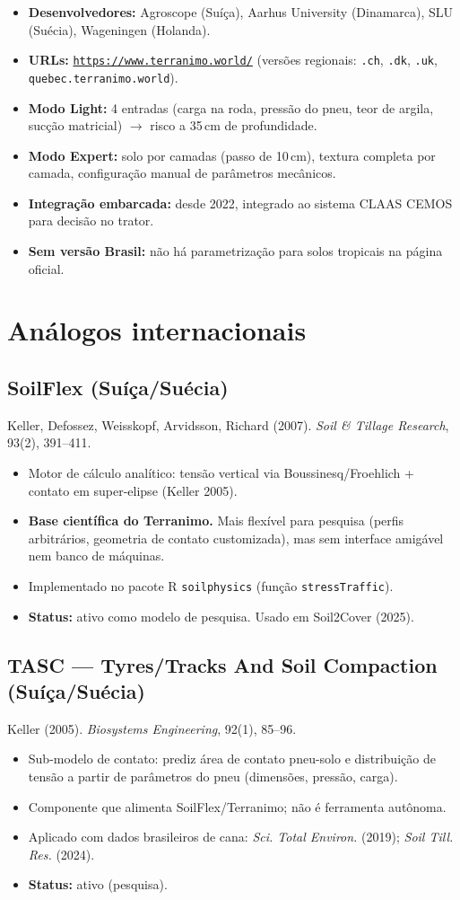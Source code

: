 \documentclass[12pt,a4paper]{article}
\newcommand{\Section}[1]{\needspace{12\baselineskip}\section{#1}}
\newcommand{\SubsectionKeep}[1]{\needspace{10\baselineskip}\subsection{#1}}
\newcommand{\Link}[1]{\href{#1}{\nolinkurl{#1}}}
\newenvironment{NoBreakItemize}
{\begin{samepage}\begin{itemize}}
{\end{itemize}\end{samepage}}
\begin{document}
\begin{NoBreakItemize}
  \item \textbf{Desenvolvedores:} Agroscope (Suíça), Aarhus University (Dinamarca), SLU (Suécia), Wageningen (Holanda).
  \item \textbf{URLs:} \Link{https://www.terranimo.world/} (versões regionais: \texttt{.ch}, \texttt{.dk}, \texttt{.uk}, \texttt{quebec.terranimo.world}).
  \item \textbf{Modo Light:} 4 entradas (carga na roda, pressão do pneu, teor de argila, sucção matricial) $\to$ risco a 35\,cm de profundidade.
  \item \textbf{Modo Expert:} solo por camadas (passo de 10\,cm), textura completa por camada, configuração manual de parâmetros mecânicos.
  \item \textbf{Integração embarcada:} desde 2022, integrado ao sistema CLAAS CEMOS para decisão no trator.
  \item \textbf{Sem versão Brasil:} não há parametrização para solos tropicais na página oficial.
\end{NoBreakItemize}

\Section{Análogos internacionais}

\SubsectionKeep{SoilFlex (Suíça/Suécia)}
Keller, Defossez, Weisskopf, Arvidsson, Richard (2007). \textit{Soil \& Tillage Research}, 93(2), 391--411.

\begin{NoBreakItemize}
  \item Motor de cálculo analítico: tensão vertical via Boussinesq/Froehlich + contato em super-elipse (Keller 2005).
  \item \textbf{Base científica do Terranimo.} Mais flexível para pesquisa (perfis arbitrários, geometria de contato customizada), mas sem interface amigável nem banco de máquinas.
  \item Implementado no pacote R \texttt{soilphysics} (função \texttt{stressTraffic}).
  \item \textbf{Status:} ativo como modelo de pesquisa. Usado em Soil2Cover (2025).
\end{NoBreakItemize}

\SubsectionKeep{TASC --- Tyres/Tracks And Soil Compaction (Suíça/Suécia)}
Keller (2005). \textit{Biosystems Engineering}, 92(1), 85--96.

\begin{NoBreakItemize}
  \item Sub-modelo de contato: prediz área de contato pneu-solo e distribuição de tensão a partir de parâmetros do pneu (dimensões, pressão, carga).
  \item Componente que alimenta SoilFlex/Terranimo; não é ferramenta autônoma.
  \item Aplicado com dados brasileiros de cana: \textit{Sci. Total Environ.} (2019); \textit{Soil Till. Res.} (2024).
  \item \textbf{Status:} ativo (pesquisa).
\end{NoBreakItemize}
\end{document}
